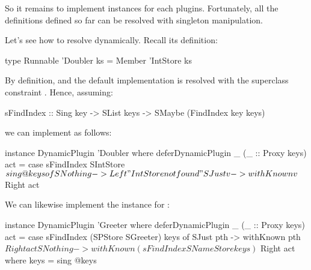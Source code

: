 \documentclass[demotion-paper.tex]{subfiles}
\begin{document}
So it remains to implement  instances for each plugins.
Fortunately, all the  definitions defined so far can be resolved with singleton manipulation.

Let's see how to resolve  dynamically.
Recall its definition:
\begin{code}
type Runnable 'Doubler ks = Member 'IntStore ks
\end{code}
By definition,  and the default implementation is resolved with the superclass constraint .
Hence, assuming:
\begin{code}
sFindIndex :: Sing key -> SList keys
      -> SMaybe (FindIndex key keys)
\end{code}
we can implement  as follows:
\begin{code}
instance DynamicPlugin 'Doubler where
  deferDynamicPlugin _ (_ :: Proxy keys) act =
    case sFindIndex SIntStore $ sing @keys of
      SNothing -> Left "IntStore not found"
      SJust v -> withKnown v $ Right act
\end{code}
We can likewise implement the instance for :
\begin{code}
instance DynamicPlugin 'Greeter where
  deferDynamicPlugin _ (_ :: Proxy keys) act =
    case sFindIndex (SPStore SGreeter) keys of
      SJust pth -> withKnown pth $ Right act
      SNothing ->
        withKnown (sFindIndex SNameStore keys) $
          Right act
    where keys = sing @keys
\end{code}
\end{document}
